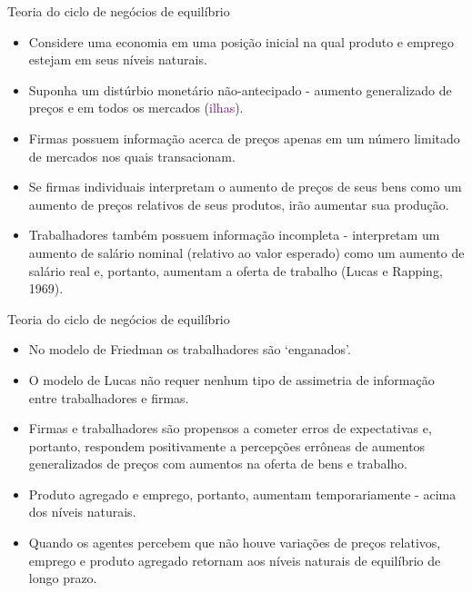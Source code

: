 \documentclass[10pt]{beamer}
\begin{document}
\begin{frame}{Teoria do ciclo de negócios de equilíbrio}
    \begin{itemize}
        \item Considere uma economia em uma posição inicial na qual produto e emprego estejam em seus níveis naturais.
        \bigskip
        \item Suponha um distúrbio monetário não-antecipado - aumento generalizado de preços e em todos os mercados (\textcolor{purple}{ilhas}).
        \bigskip
        \item Firmas possuem informação acerca de preços apenas em um número limitado de mercados nos quais transacionam.
        \bigskip
        \item Se firmas individuais interpretam o aumento de preços de seus bens como um aumento de preços relativos de seus produtos, irão aumentar sua produção.
        \bigskip
        \item Trabalhadores também possuem informação incompleta - interpretam um aumento de salário nominal (relativo ao valor esperado) como um aumento de salário real e, portanto, aumentam a oferta de trabalho (Lucas e Rapping, 1969).
    \end{itemize}
\end{frame}

\begin{frame}{Teoria do ciclo de negócios de equilíbrio}
    \begin{itemize}
        \item No modelo de Friedman os trabalhadores são `enganados'.
        \bigskip
        \item O modelo de Lucas não requer nenhum tipo de assimetria de informação entre trabalhadores e firmas.
        \bigskip
        \item Firmas e trabalhadores são propensos a cometer erros de expectativas e, portanto, respondem positivamente a percepções errôneas de aumentos generalizados de preços com aumentos na oferta de bens e trabalho.
        \bigskip
        \item Produto agregado e emprego, portanto, aumentam temporariamente - acima dos níveis naturais.
        \bigskip
        \item Quando os agentes percebem que não houve variações de preços relativos, emprego e produto agregado retornam aos níveis naturais de equilíbrio de longo prazo.
    \end{itemize}
\end{frame}
\end{document}
